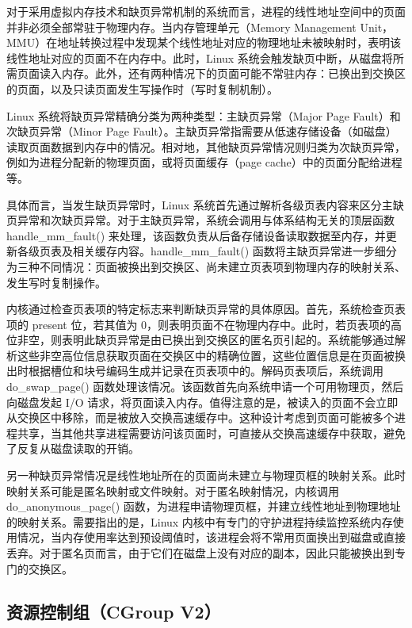 对于采用虚拟内存技术和缺页异常机制的系统而言，进程的线性地址空间中的页面并非必须全部常驻于物理内存。当内存管理单元（Memory Management Unit，MMU）在地址转换过程中发现某个线性地址对应的物理地址未被映射时，表明该线性地址对应的页面不在内存中。此时，Linux 系统会触发缺页中断，从磁盘将所需页面读入内存。此外，还有两种情况下的页面可能不常驻内存：已换出到交换区的页面，以及只读页面发生写操作时（写时复制机制）。

Linux 系统将缺页异常精确分类为两种类型：主缺页异常（Major Page Fault）和次缺页异常（Minor Page Fault）。主缺页异常指需要从低速存储设备（如磁盘）读取页面数据到内存中的情况。相对地，其他缺页异常情况则归类为次缺页异常，例如为进程分配新的物理页面，或将页面缓存（page cache）中的页面分配给进程等。

具体而言，当发生缺页异常时，Linux 系统首先通过解析各级页表内容来区分主缺页异常和次缺页异常。对于主缺页异常，系统会调用与体系结构无关的顶层函数 handle\_mm\_fault() 来处理，该函数负责从后备存储设备读取数据至内存，并更新各级页表及相关缓存内容。handle\_mm\_fault() 函数将主缺页异常进一步细分为三种不同情况：页面被换出到交换区、尚未建立页表项到物理内存的映射关系、发生写时复制操作。

内核通过检查页表项的特定标志来判断缺页异常的具体原因。首先，系统检查页表项的 present 位，若其值为 0，则表明页面不在物理内存中。此时，若页表项的高位非空，则表明此缺页异常是由已换出到交换区的匿名页引起的。系统能够通过解析这些非空高位信息获取页面在交换区中的精确位置，这些位置信息是在页面被换出时根据槽位和块号编码生成并记录在页表项中的。解码页表项后，系统调用 do\_swap\_page() 函数处理该情况。该函数首先向系统申请一个可用物理页，然后向磁盘发起 I/O 请求，将页面读入内存。值得注意的是，被读入的页面不会立即从交换区中移除，而是被放入交换高速缓存中。这种设计考虑到页面可能被多个进程共享，当其他共享进程需要访问该页面时，可直接从交换高速缓存中获取，避免了反复从磁盘读取的开销。

另一种缺页异常情况是线性地址所在的页面尚未建立与物理页框的映射关系。此时映射关系可能是匿名映射或文件映射。对于匿名映射情况，内核调用 do\_anonymous\_page() 函数，为进程申请物理页框，并建立线性地址到物理地址的映射关系。需要指出的是，Linux 内核中有专门的守护进程持续监控系统内存使用情况，当内存使用率达到预设阈值时，该进程会将不常用页面换出到磁盘或直接丢弃。对于匿名页而言，由于它们在磁盘上没有对应的副本，因此只能被换出到专门的交换区。


\subsection{资源控制组（CGroup V2）}

